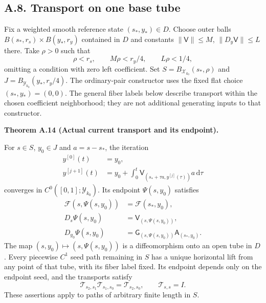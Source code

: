 \documentclass[
  english,
  11pt,
  reqno]{amsart}
\makeatletter
\newcommand{\pandocstatementheading}[1]{%
  \par\if@nobreak\else
    \addpenalty{\@beginparpenalty}%
    \addvspace{.5\baselineskip plus .2\baselineskip minus .2\baselineskip}%
  \fi
  {\normalfont\bfseries #1\par}%
  \nobreak\@afterindenttrue\@afterheading
}
\makeatother
\begin{document}
\subsection{A.8. Transport on one base
tube}\label{a.8.-transport-on-one-base-tube}\label{sec:online-current-flat-input-transport}

Fix a weighted smooth reference state \((s_*,y_*)\in D\). Choose outer
balls \(B(s_*,r_s)\times B(y_*,r_y)\) contained in \(D\) and constants
\(\|\mathsf V\|\le M\), \(\|D_y\mathsf V\|\le L\) there. Take \(\rho>0\)
such that%
 \[
\rho<r_s,\qquad M\rho<r_y/4,\qquad L\rho<1/4,
\] omitting a condition with zero left coefficient. Set
\(S=B_{\mathcal X_{k_0}}(s_*,\rho)\) and
\(J=B_{\mathcal Y_{k_0}}(y_*,r_y/4)\). The ordinary-pair constructor
uses the fixed flat choice \((s_*,y_*)=(0,0)\). The general fiber labels
below describe transport within the chosen coefficient neighborhood;
they are not additional generating inputs to that constructor.

\pandocstatementheading{\leavevmode{}\label{thm:online-current-input-transport}Theorem A.14 (Actual current transport and its endpoint).}

For \(s\in S\), \(y_0\in J\) and \(a=s-s_*\), the iteration%
 \[
\begin{aligned}
y^{[0]}(t)&=y_0,\\
y^{[j+1]}(t)
&=y_0+\int_0^t
\mathsf V_{(s_*+\tau a,y^{[j]}(\tau))}a\,\mathrm d\tau
\end{aligned}
\] converges in \(C^0([0,1];\mathcal Y_{k_0})\). Its endpoint
\(\Psi(s,y_0)\) satisfies%
 \[
\begin{aligned}
\mathcal F(s,\Psi(s,y_0))&=\mathcal F(s_*,y_0),\\
D_s\Psi(s,y_0)&=\mathsf V_{(s,\Psi(s,y_0))},\\
D_{y_0}\Psi(s,y_0)&=
\mathsf G_{(s,\Psi(s,y_0))}\mathsf A_{(s_*,y_0)}.
\end{aligned}
\] The map \((s,y_0)\mapsto(s,\Psi(s,y_0))\) is a diffeomorphism onto an
open tube in \(D\). Every piecewise \(C^1\) seed path remaining in \(S\)
has a unique horizontal lift from any point of that tube, with its fiber
label fixed. Its endpoint depends only on the endpoint seed, and the
transports satisfy%
 \[
\mathscr T_{s_2,s_1}\mathscr T_{s_1,s_0}
=\mathscr T_{s_2,s_0},\qquad
\mathscr T_{s,s}=I.
\] These assertions apply to paths of arbitrary finite length in \(S\).
\end{document}
